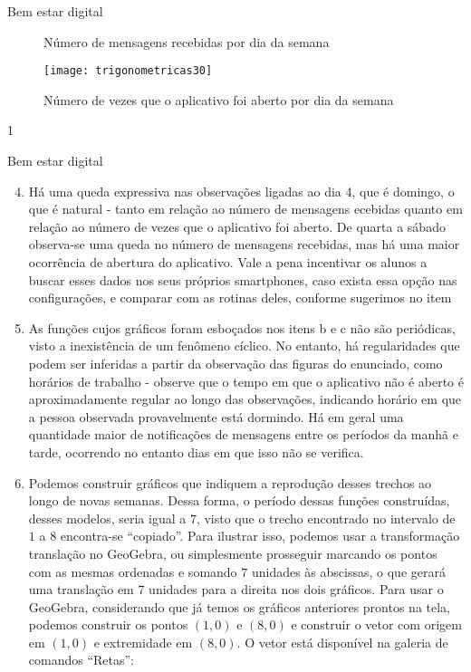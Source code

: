 \begin{answer}{Bem estar digital}
{\begin{enumerate}[left=7.5pt, wide]
\begin{multicols}{2}
\begin{figure}[H]
\caption{Número de mensagens
recebidas por dia da semana}

\end{figure}
\begin{figure}[H]
\centering
\texttt{[image: trigonometricas30]}
\caption{Número de vezes que o
aplicativo foi aberto por dia da semana}

\end{figure}
\end{multicols}
\end{enumerate}
}{1}
\end{answer}
\clearmargin
\begin{answer}{Bem estar digital}
{
	\begin{enumerate}[left=7.5pt, wide]\setcounter{enumi}{3}
	\item Há uma queda expressiva nas observações ligadas ao dia 4, que é domingo, o que é natural - tanto em relação ao número de mensagens  ecebidas quanto em relação ao número de vezes que o aplicativo foi aberto. De quarta a sábado observa-se uma queda no número de mensagens recebidas, mas há uma maior ocorrência de abertura do aplicativo. Vale a pena incentivar os alunos a buscar esses dados nos seus próprios smartphones, caso exista essa opção nas configurações, e comparar com as rotinas deles, conforme sugerimos no item 

	\item As funções cujos gráficos foram esboçados nos itens b e c não são periódicas, visto a inexistência de um fenômeno cíclico. No entanto, há regularidades que podem ser inferidas a partir da observação das figuras do enunciado, como horários de trabalho - observe que o tempo em que o aplicativo não é aberto é aproximadamente regular ao longo das observações, indicando horário em que a pessoa observada provavelmente está dormindo. Há em geral uma quantidade maior de notificações de mensagens entre os períodos da manhã e tarde, ocorrendo no entanto dias em que isso não se verifica.
	\item Podemos construir gráficos que indiquem a reprodução desses trechos ao longo de novas semanas. Dessa forma, o período dessas funções construídas, desses modelos, seria igual a $7$, visto que o trecho encontrado no intervalo de $1$ a $8$ encontra-se “copiado”. Para ilustrar isso,  podemos usar a transformação translação no GeoGebra, ou simplesmente prosseguir marcando os pontos com as mesmas ordenadas e somando $7$ unidades às abscissas, o que gerará uma translação em $7$ unidades para a direita nos dois gráficos. Para usar o GeoGebra, considerando que já temos os gráficos anteriores prontos na tela, podemos construir os pontos $(1,0)$ e $(8,0)$ e construir o vetor com origem em $(1,0)$ e extremidade em $(8,0)$. O vetor está disponível na galeria de comandos “Retas”:


\end{enumerate}}
\end{answer}

